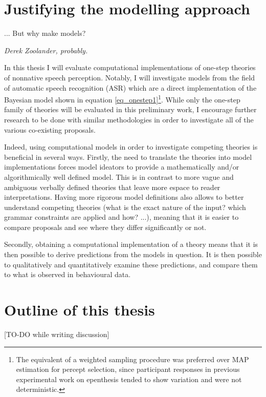 \section{Justifying the modelling approach}
\epigraph{... But why make models?}{\textit{Derek Zoolander, probably.}}

In this thesis I will evaluate computational implementations of one-step theories of nonnative speech perception. Notably, I will investigate models from the field of automatic speech recognition (ASR) which are a direct implementation of the Bayesian model shown in equation \ref{eq_onestep1}\footnote{The equivalent of a weighted sampling procedure was preferred over MAP estimation for percept selection, since participant responses in previous experimental work on epenthesis tended to show variation and were not deterministic.}. 
While only the one-step family of theories will be evaluated in this preliminary work, I encourage further research to be done with similar methodologies in order to investigate all of the various co-existing proposals.

Indeed, using computational models in order to investigate competing theories is beneficial in several ways. Firstly, the need to translate the theories into model implementations forces model ideators to provide a mathematically and/or algorithmically well defined model. This is in contrast to more vague and ambiguous verbally defined theories that leave more espace to reader interpretations. Having more rigorous model definitions also allows to better understand competing theories (what is the exact nature of the input? which grammar constraints are applied and how? ...), meaning that it is easier to compare proposals and see where they differ significantly or not. 

Secondly, obtaining a computational implementation of a theory means that it is then possible to derive predictions from the models in question. It is then possible to qualitatively and quantitatively examine these predictions, and compare them to what is observed in behavioural data.

\section{Outline of this thesis}

{\color{red}[TO-DO while writing discussion]}



